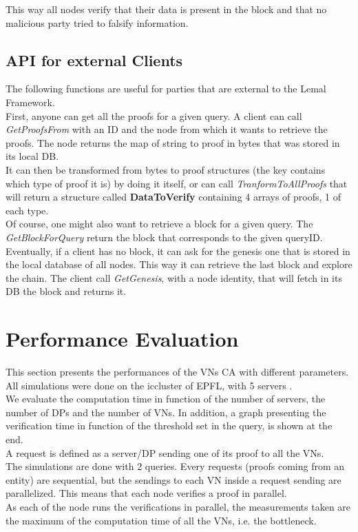 \documentclass{article}
\begin{document}
This way all nodes verify that their data is present in the block and that no malicious party tried to falsify information.\\

\subsection{API for external Clients}
The following functions are useful for parties that are external to the Lemal Framework.\\
First, anyone can get all the proofs for a given query. A client can call \textit{GetProofsFrom} with an ID and the node from which it wants to retrieve the proofs. The node returns the map of string to proof in bytes that was stored in its local DB.\\
It can then be transformed from bytes to proof structures (the key contains which type of proof it is) by doing it itself, or can call \textit{TranformToAllProofs} that will return a structure called \textbf{DataToVerify} containing 4 arrays of proofs, 1 of each type.\\

Of course, one might also want to retrieve a block for a given query. The \textit{GetBlockForQuery} return the block that corresponds to the given queryID.\\

Eventually, if a client has no block, it can ask for the genesis one that is stored in the local database of all nodes. This way it can retrieve the last block and explore the chain. The client call \textit{GetGenesis}, with a node identity, that will fetch in its DB the block and returns it.

\section{Performance Evaluation}
This section presents the performances of the VNs CA with different parameters. All simulations were done on the iccluster of EPFL, with 5 servers \cite{cluster}.\\
We evaluate the computation time in function of the number of servers, the number of DPs and the number of VNs. In addition, a graph presenting the verification time in function of the threshold set in the query, is shown at the end.\\
A request is defined as a server/DP sending one of its proof to all the VNs.\\
The simulations are done with 2 queries. Every requests (proofs coming from an entity) are sequential, but the sendings to each VN inside a request sending are parallelized. This means that each node verifies a proof in parallel.\\
As each of the node runs the verifications in parallel, the measurements taken are the maximum of the computation time of all the VNs, i.e. the bottleneck.\\
\end{document}
